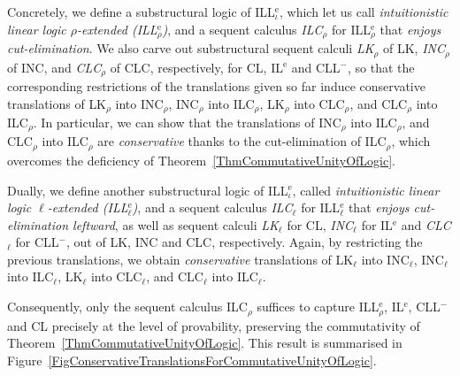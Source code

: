 \documentclass[a4paper]{article}
\theoremstyle{definition}
\theoremstyle{theorem}
\theoremstyle{remark}
\begin{document}
Concretely, we define a substructural logic of ILL$^{\text{e}}_\iota$, which let us call \emph{intuitionistic linear logic $\rho$-extended (ILL$^{\text{e}}_\rho$)}, and a sequent calculus \emph{\textsf{ILC$_\rho$}} for ILL$^{\text{e}}_\rho$ that \emph{enjoys cut-elimination}.
We also carve out substructural sequent calculi \emph{\textsf{LK$_\rho$}} of \textsf{LK}, \emph{\textsf{INC$_\rho$}} of \textsf{INC}, and \emph{\textsf{CLC$_\rho$}} of \textsf{CLC}, respectively, for CL, IL$^{\text{e}}$ and CLL$^-$, so that the corresponding restrictions of the translations given so far induce conservative translations of \textsf{LK$_\rho$} into \textsf{INC$_\rho$}, \textsf{INC$_\rho$} into \textsf{ILC$_\rho$}, \textsf{LK$_\rho$} into \textsf{CLC$_\rho$}, and \textsf{CLC$_\rho$} into \textsf{ILC$_\rho$}.
In particular, we can show that the translations of \textsf{INC$_\rho$} into \textsf{ILC$_\rho$}, and \textsf{CLC$_\rho$} into \textsf{ILC$_\rho$} are \emph{conservative} thanks to the cut-elimination of \textsf{ILC$_\rho$}, which overcomes the deficiency of Theorem~\ref{ThmCommutativeUnityOfLogic}.

Dually, we define another substructural logic of ILL$^{\text{e}}_\iota$, called \emph{intuitionistic linear logic $\ell$-extended (ILL$^{\text{e}}_\ell$)}, and a sequent calculus \emph{\textsf{ILC$_\ell$}} for ILL$^{\text{e}}_\ell$ that \emph{enjoys cut-elimination leftward}, as well as sequent calculi \emph{\textsf{LK$_\ell$}} for CL, \emph{\textsf{INC$_\ell$}} for IL$^{\text{e}}$ and \emph{\textsf{CLC$_\ell$}} for CLL$^-$, out of \textsf{LK}, \textsf{INC} and \textsf{CLC}, respectively.
Again, by restricting the previous translations, we obtain \emph{conservative} translations of \textsf{LK$_\ell$} into \textsf{INC$_\ell$}, \textsf{INC$_\ell$} into \textsf{ILC$_\ell$}, \textsf{LK$_\ell$} into \textsf{CLC$_\ell$}, and \textsf{CLC$_\ell$} into \textsf{ILC$_\ell$}.
\fi

Consequently, only the sequent calculus \textsf{ILC$_\rho$} suffices to capture ILL$^{\text{e}}_\rho$, IL$^{\text{e}}$, CLL$^-$ and CL precisely at the level of provability, preserving the commutativity of Theorem~\ref{ThmCommutativeUnityOfLogic}.
This result is summarised in Figure~\ref{FigConservativeTranslationsForCommutativeUnityOfLogic}.
\end{document}
